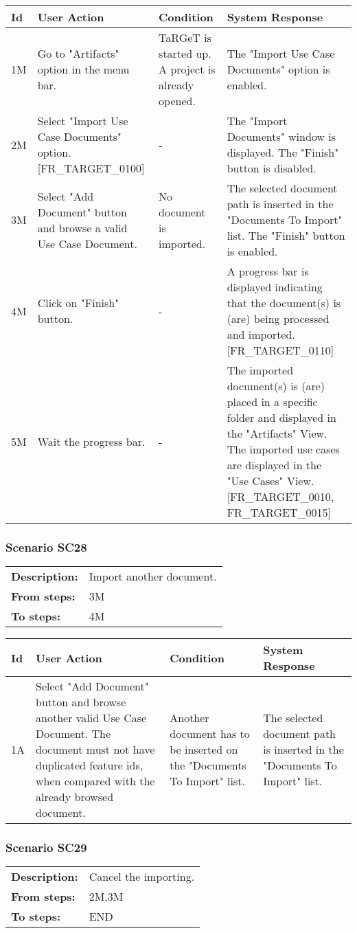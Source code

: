 \documentclass[a4paper,11pt]{article}
\newcommand{\bl}{\\ \hline}
\begin{document}
\begin{tabular}{|p{0.8in}|p{1.6in}|p{1.6in}|p{1.6in}|}
\hline
Id & User Action & Condition & System Response  \bl 
1M & Go to "Artifacts" option in the menu bar. & TaRGeT is started up. A project is already opened.
					 & The "Import Use Case Documents" option is enabled.
					 \bl 
2M & Select "Import Use Case Documents" option. [FR_TARGET_0100]
					 & - & The "Import Documents" window is displayed. The "Finish"
						button is disabled.  \bl 
3M & Select "Add Document" button and browse a valid Use Case
						Document.  & No document is imported. & The selected document path is inserted in the "Documents
						To Import" list. The "Finish" button is enabled. \bl 
4M & Click on "Finish" button. & - & A progress bar is displayed indicating that the
						document(s) is (are) being processed and imported.[FR_TARGET_0110]
					 \bl 
5M & Wait the progress bar.  & - & The imported document(s) is (are) placed in a specific
						folder and displayed in the "Artifacts" View. The imported use
						cases are displayed in the "Use Cases" View. [FR_TARGET_0010,
						FR_TARGET_0015] \bl 
\end{tabular}
\subsubsection*{Scenario SC28}
\begin{tabular}{p{1in}p{4in}}
{\bf Description:} & Import another document. \\
{\bf From steps:} & 3M \\
{\bf To steps:} & 4M \\
\end{tabular}
 
\begin{tabular}{|p{0.8in}|p{1.6in}|p{1.6in}|p{1.6in}|}
\hline
Id & User Action & Condition & System Response  \bl 
1A & Select "Add Document" button and browse another valid Use
						Case Document. The document must not have duplicated feature ids,
						when compared with the already browsed document.  & Another document has to be inserted on the "Documents To
						Import" list. & The selected document path is inserted in the "Documents
						To Import" list. \bl 
\end{tabular}
\subsubsection*{Scenario SC29}
\begin{tabular}{p{1in}p{4in}}
{\bf Description:} & Cancel the importing. \\
{\bf From steps:} & 2M,3M \\
{\bf To steps:} & END \\
\end{tabular}
 
\end{document}

